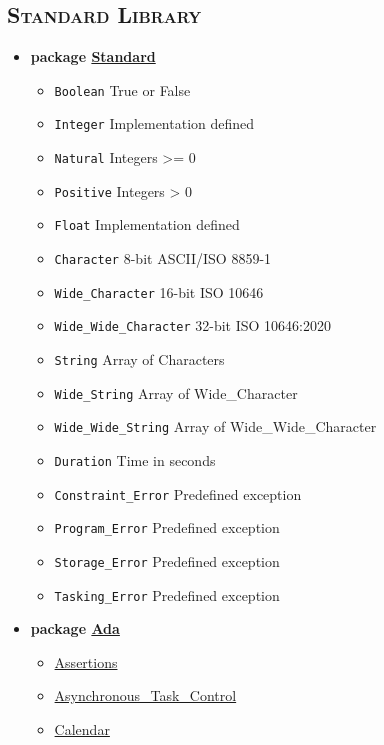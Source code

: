 \begin{multicols*}{\columnnr}
\begin{scriptsize}
\section*{\textsc{Standard Library}}
\begin{itemize}[leftmargin=0mm]
\item[] \textbf{package \href{http://www.ada-auth.org/standards/22rm/html/RM-A-1.html}{Standard}}
  \begin{itemize}[leftmargin=5mm]
  \item[] \texttt{Boolean} True or False
  \item[] \texttt{Integer} Implementation defined
  \item[] \texttt{Natural} Integers >= 0
  \item[] \texttt{Positive} Integers > 0
  \item[] \texttt{Float} Implementation defined
  \item[] \texttt{Character} 8-bit ASCII/ISO 8859-1
  \item[] \texttt{Wide\_Character} 16-bit ISO 10646
  \item[] \texttt{Wide\_Wide\_Character} 32-bit ISO 10646:2020
  \item[] \texttt{String} Array of Characters
  \item[] \texttt{Wide\_String} Array of Wide\_Character
  \item[] \texttt{Wide\_Wide\_String} Array of Wide\_Wide\_Character
  \item[] \texttt{Duration} Time in seconds
  \item[] \texttt{Constraint\_Error} Predefined exception
  \item[] \texttt{Program\_Error} Predefined exception
  \item[] \texttt{Storage\_Error} Predefined exception
  \item[] \texttt{Tasking\_Error} Predefined exception
  \end{itemize}
\item[] \textbf{package \href{http://www.ada-auth.org/standards/22rm/html/RM-A-2.html}{Ada}}
  \begin{itemize}[leftmargin=5mm]
  \item[] \href{http://www.ada-auth.org/standards/22rm/html/RM-11-4-2.html}{Assertions}
  \item[] \href{http://www.ada-auth.org/standards/22rm/html/RM-D-11.html}{Asynchronous\_Task\_Control}
  \item[] \href{http://www.ada-auth.org/standards/22rm/html/RM-9-6.html}{Calendar}

\end{itemize}
\end{itemize}
\end{scriptsize}
\end{multicols*}
